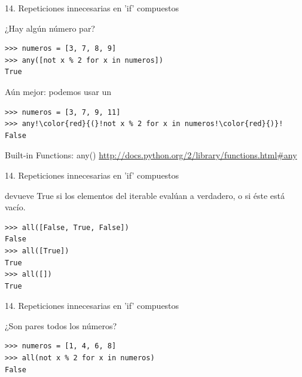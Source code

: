 \documentclass[14pt]{beamer}
\begin{document}
\begin{frame}[fragile]{14. \large Repeticiones innecesarias en 'if' compuestos}
  \footnotesize
  \begin{exampleblock}
    {¿Hay algún número par?}
    \begin{lstlisting}
>>> numeros = [3, 7, 8, 9]
>>> any([not x % 2 for x in numeros])
True
    \end{lstlisting}
  \end{exampleblock}

  \normalsize
  \begin{alertblock}{}
    \centering
    Aún mejor: podemos usar un 
  \end{alertblock}

  \footnotesize
  \begin{exampleblock}{}
    \begin{lstlisting}[escapechar=!]
>>> numeros = [3, 7, 9, 11]
>>> any!\color{red}{(}!not x % 2 for x in numeros!\color{red}{)}!
False
    \end{lstlisting}
  \end{exampleblock}

  \small
  \begin{block}
    {\centering Built-in Functions: any()}
    \centering \url{http://docs.python.org/2/library/functions.html\#any}
  \end{block}
\end{frame}

\begin{frame}[fragile]{14. \large Repeticiones innecesarias en 'if' compuestos}
  \begin{block}{}
    \centering
     devueve True si  los elementos
    del iterable evalúan a verdadero, o si éste está vacío.
  \end{block}

  \begin{exampleblock}{}
    \begin{lstlisting}
>>> all([False, True, False])
False
>>> all([True])
True
>>> all([])
True
    \end{lstlisting}
  \end{exampleblock}
\end{frame}

\begin{frame}[fragile]{14. \large Repeticiones innecesarias en 'if' compuestos}
  \begin{exampleblock}
    {¿Son pares todos los números?}
    \begin{lstlisting}
>>> numeros = [1, 4, 6, 8]
>>> all(not x % 2 for x in numeros)
False
    \end{lstlisting}
  \end{exampleblock}
\end{frame}
\end{document}
